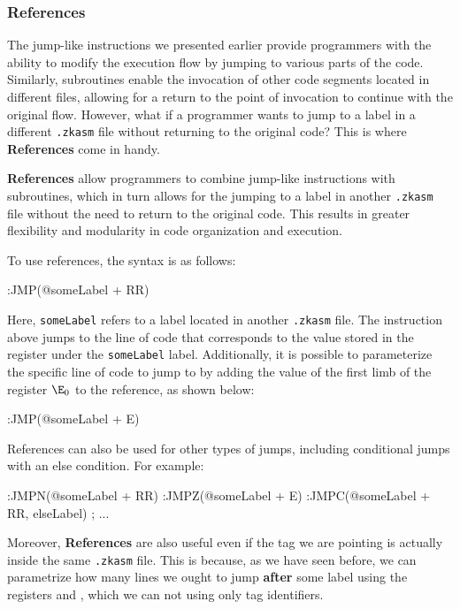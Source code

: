 \subsubsection{References}

The jump-like instructions we presented earlier provide programmers with the ability to modify the execution flow by jumping to various parts of the code. Similarly, subroutines enable the invocation of other code segments located in different files, allowing for a return to the point of invocation to continue with the original flow. However, what if a programmer wants to jump to a label in a different \texttt{.zkasm} file without returning to the original code? This is where \textbf{References} come in handy.

\textbf{References} allow programmers to combine jump-like instructions with subroutines, which in turn allows for the jumping to a label in another \texttt{.zkasm} file without the need to return to the original code. This results in greater flexibility and modularity in code organization and execution.

To use references, the syntax is as follows:

\begin{zkasm}
:JMP(@someLabel + RR)
\end{zkasm}

Here, \texttt{someLabel} refers to a label located in another \texttt{.zkasm} file. The instruction above jumps to the line of code that corresponds to the value stored in the register \RR under the \texttt{someLabel} label. Additionally, it is possible to parameterize the specific line of code to jump to by adding the value of the first limb of the register $\E_0$ to the reference, as shown below:

\begin{zkasm}
    :JMP(@someLabel + E)
\end{zkasm}

References can also be used for other types of jumps, including conditional jumps with an else condition. For example:

\begin{zkasm}
    :JMPN(@someLabel + RR)
    :JMPZ(@someLabel + E)
    :JMPC(@someLabel + RR, elseLabel)
    ; ...
\end{zkasm}

Moreover, \textbf{References} are also useful even if the tag we are pointing is actually inside the same \texttt{.zkasm} file. This is because, as we have seen before, we can parametrize how many lines we ought to jump \textbf{after} some label using the registers \E and \RR, which we can not using only tag identifiers. 

